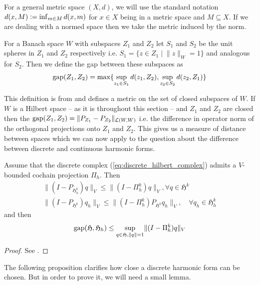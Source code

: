 \documentclass[../master_thesis.tex]{subfiles}
\begin{document}
For a general metric space $(X,d)$, we will use the standard notation 
$d(x,M) \vcentcolon= \inf_{m\in M} d(x,m)$ for $x\in X$ being in a 
metric space and $M \subseteq X$. If we are dealing with a normed space then we 
take the metric induced by the norm.

\begin{definition}
    For a Banach space $W$ with subspaces $Z_1$ and $Z_2$
    let $S_1$ and $S_2$ be the unit spheres in $Z_1$ and $Z_2$ respectively i.e.
    $S_1 = \{ z\in Z_1 \mid \lVert z \rVert _W = 1 \}$ and analogous for $S_2$.
    Then we define 
    the gap between these subspaces as 
    \begin{align*}
        \operatorname{gap}(Z_1, Z_2) = \max\{ \sup_{z_1 \in S_1} d(z_1, Z_2), \sup_{z_2 \in S_2} d(z_2, Z_1) \}
    \end{align*}
\end{definition}
This definition is from \cite[Ch.4 §2.1]{kato_perturbation_theory} and defines a metric on the set of closed subspaces
of $W$.
If $W$ is a Hilbert space -- as it is throughout this section -- and $Z_1$ and $Z_2$ are closed then
the $\operatorname{gap}(Z_1, Z_2) = \lVert P_{Z_1} - P_{Z_2} \rVert _{\mathcal{L}(W,W)}$ i.e. the difference in operator norm of the 
orthogonal projections onto $Z_1$ and $Z_2$. This gives us a measure of distance between 
spaces which we can now apply to the question about the difference between 
discrete and continuous harmonic forms.

\begin{proposition}
    Assume that the discrete complex (\ref{eq:discrete_hilbert_complex}) admits a $V$-bounded cochain projection
    $\Pi_h$. Then
    \begin{align}
        \lVert (I - P_{\mathfrak{H}^k_h}) q \rVert _V \leq \lVert (I - \Pi_h^k) q \rVert _V, 
            \forall q \in \mathfrak{H}^k \label{eq:difference_identity_projection_discrete_harmonics}
        \\ \lVert (I - P_{\mathfrak{H}^k}) q_h \rVert _V 
        \leq \lVert (I - \Pi_h^k)P_{\mathfrak{H}^k} q_h \rVert _V, \quad 
                \forall q_h \in \mathfrak{H}^k_h 
    \end{align}
    and then 
    \begin{align*}
        \operatorname{gap} (\mathfrak{H}, \mathfrak{H}_h) 
        \leq \sup_{q \in \mathfrak{H}, \lVert q \rVert = 1} \lVert (I - \Pi_h^k) q \rVert _V
    \end{align*}
\end{proposition}
\begin{proof}
    See \cite[Thm.\,5.2]{arnold}. 
\end{proof}
The following proposition 
clarifies how close a discrete harmonic form can be chosen. But in order to prove it, 
we will need a small lemma.
\end{document}
